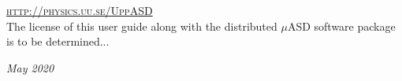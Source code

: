 \documentclass[11pt,fleqn,a4]{book} %
\begin{document}

\noindent \href{http://physics.uu.se/UppASD}{\textsc{http://physics.uu.se/UppASD}}\\ %

\noindent The license of this user guide along with the distributed $\mu$ASD software package is to be determined...

\noindent \textit{May 2020} %




\pagestyle{empty} %

\tableofcontents %

\cleardoublepage %

\pagestyle{fancy} %



\end{document}
